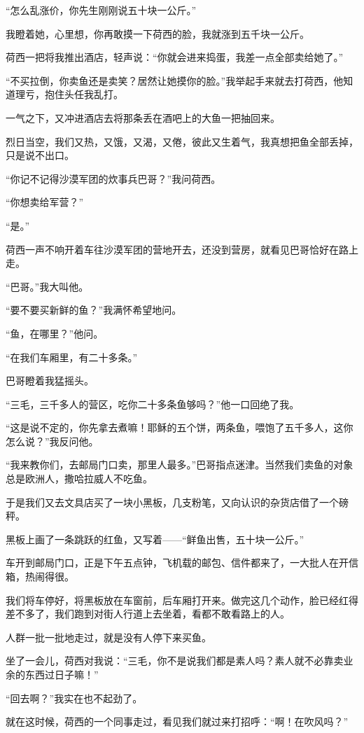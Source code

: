 \par “怎么乱涨价，你先生刚刚说五十块一公斤。”
\par 我瞪着她，心里想，你再敢摸一下荷西的脸，我就涨到五千块一公斤。
\par 荷西一把将我推出酒店，轻声说：“你就会进来捣蛋，我差一点全部卖给她了。”
\par “不买拉倒，你卖鱼还是卖笑？居然让她摸你的脸。”我举起手来就去打荷西，他知道理亏，抱住头任我乱打。
\par 一气之下，又冲进酒店去将那条丢在酒吧上的大鱼一把抽回来。
\par 烈日当空，我们又热，又饿，又渴，又倦，彼此又生着气，我真想把鱼全部丢掉，只是说不出口。
\par “你记不记得沙漠军团的炊事兵巴哥？”我问荷西。
\par “你想卖给军营？”
\par “是。”
\par 荷西一声不响开着车往沙漠军团的营地开去，还没到营房，就看见巴哥恰好在路上走。
\par “巴哥。”我大叫他。
\par “要不要买新鲜的鱼？”我满怀希望地问。
\par “鱼，在哪里？”他问。
\par “在我们车厢里，有二十多条。”
\par 巴哥瞪着我猛摇头。
\par “三毛，三千多人的营区，吃你二十多条鱼够吗？”他一口回绝了我。
\par “这是说不定的，你先拿去煮嘛！耶稣的五个饼，两条鱼，喂饱了五千多人，这你怎么说？”我反问他。
\par “我来教你们，去邮局门口卖，那里人最多。”巴哥指点迷津。当然我们卖鱼的对象总是欧洲人，撒哈拉威人不吃鱼。
\par 于是我们又去文具店买了一块小黑板，几支粉笔，又向认识的杂货店借了一个磅秤。
\par 黑板上画了一条跳跃的红鱼，又写着——“鲜鱼出售，五十块一公斤。”
\par 车开到邮局门口，正是下午五点钟，飞机载的邮包、信件都来了，一大批人在开信箱，热闹得很。
\par 我们将车停好，将黑板放在车窗前，后车厢打开来。做完这几个动作，脸已经红得差不多了，我们跑到对街人行道上去坐着，看都不敢看路上的人。
\par 人群一批一批地走过，就是没有人停下来买鱼。
\par 坐了一会儿，荷西对我说：“三毛，你不是说我们都是素人吗？素人就不必靠卖业余的东西过日子嘛！”
\par “回去啊？”我实在也不起劲了。
\par 就在这时候，荷西的一个同事走过，看见我们就过来打招呼：“啊！在吹风吗？”

